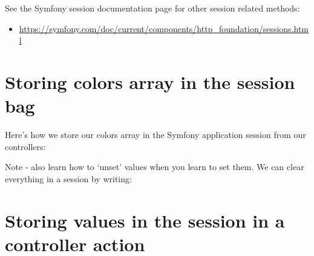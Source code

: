 \documentclass[a4paperpaper,openright]{book}
\newenvironment{Shaded}{}{}
\newcommand{\CommentTok}[1]{\textcolor[rgb]{0.38,0.63,0.69}{\textit{#1}}}
\newcommand{\KeywordTok}[1]{\textcolor[rgb]{0.00,0.44,0.13}{\textbf{#1}}}
\newcommand{\NormalTok}[1]{#1}
\newcommand{\OtherTok}[1]{\textcolor[rgb]{0.00,0.44,0.13}{#1}}
\newcommand{\StringTok}[1]{\textcolor[rgb]{0.25,0.44,0.63}{#1}}
\providecommand{\tightlist}{%
  \setlength{\itemsep}{0pt}\setlength{\parskip}{0pt}}
\begin{document}
See the Symfony session documentation page for other session related
methods:

\begin{itemize}
\tightlist
\item
  \url{https://symfony.com/doc/current/components/http_foundation/sessions.html}
\end{itemize}

\hypertarget{storing-colors-array-in-the-session-bag}{%
\section{Storing colors array in the session
bag}\label{storing-colors-array-in-the-session-bag}}

Here's how we store our colors array in the Symfony application session
from our controllers:

\begin{Shaded}
\end{Shaded}

Note - also learn how to `unset' values when you learn to set them. We
can clear everything in a session by writing:

\begin{Shaded}
\end{Shaded}

\hypertarget{storing-values-in-the-session-in-a-controller-action}{%
\section{Storing values in the session in a controller
action}\label{storing-values-in-the-session-in-a-controller-action}}
\end{document}
